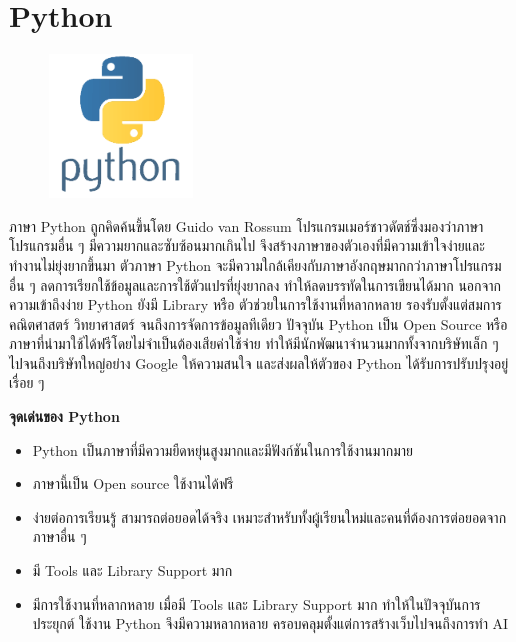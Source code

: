 \section{Python}
\label{Python}
\begin{figure}[!thb]
	\captionsetup{justification=centering}
	\centering
	\includegraphics[width=1.5in]{figures/python.png}
	\label{fig:python}
\end{figure}
ภาษา Python ถูกคิดค้นขึ้นโดย Guido van Rossum โปรแกรมเมอร์ชาวดัตช์ซึ่งมองว่าภาษาโปรแกรมอื่น ๆ  มีความยากและซับซ้อนมากเกินไป จึงสร้างภาษาของตัวเองที่มีความเข้าใจง่ายและทำงานไม่ยุ่งยากขึ้นมา ตัวภาษา Python จะมีความใกล้เคียงกับภาษาอังกฤษมากกว่าภาษา\mbox{โปรแกรม} อื่น ๆ ลดการเรียกใช้ข้อมูลและการใช้ตัวแปรที่ยุ่งยากลง ทำให้ลดบรรทัดในการเขียนได้มาก นอกจากความเข้าถึงง่าย Python ยังมี Library หรือ ตัวช่วยในการใช้งานที่หลากหลาย รองรับตั้งแต่สมการคณิตศาสตร์ วิทยาศาสตร์ จนถึงการจัดการข้อมูลทีเดียว ปัจจุบัน Python เป็น Open Source หรือ ภาษาที่นำมาใช้ได้ฟรีโดยไม่จำเป็นต้องเสียค่าใช้จ่าย ทำให้มีนักพัฒนาจำนวนมากทั้งจากบริษัทเล็ก ๆ  ไปจนถึงบริษัทใหญ่อย่าง Google ให้ความสนใจ และส่งผลให้ตัวของ Python ได้รับการปรับปรุงอยู่เรื่อย ๆ

\begin{flushleft}
	\textbf{จุดเด่นของ Python}
\end{flushleft}
\begin{itemize}
	\item Python เป็นภาษาที่มีความยืดหยุ่นสูงมากและมีฟังก์ชันในการใช้งานมากมาย 
	\item ภาษานี้เป็น Open source ใช้งานได้ฟรี
	\item ง่ายต่อการเรียนรู้ สามารถต่อยอดได้จริง เหมาะสำหรับทั้งผู้เรียนใหม่และคนที่ต้องการต่อยอดจากภาษาอื่น ๆ
	\item มี Tools และ Library Support มาก
	\item มีการใช้งานที่หลากหลาย เมื่อมี Tools และ Library Support มาก ทำให้ในปัจจุบันการ\mbox{ประยุกต์} ใช้งาน Python จึงมีความหลากหลาย ครอบคลุมตั้งแต่การสร้างเว็บไปจนถึงการทำ AI
\end{itemize}
\newpage

